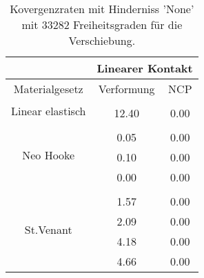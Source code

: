 \begin{table} 
\centering 
\begin{tabular}{c|cc|} 
\cline{2-3} 
 & \multicolumn{2}{|c|}{Linearer Kontakt} \\ 
\hline 
\multicolumn{1}{|c|}{Materialgesetz} & \multicolumn{1}{c|}{Verformung} & \multicolumn{1}{c|}{NCP} \\ 
\hline 
\multicolumn{1}{|c|}{\multirow{2}{*}{Linear elastisch}} &\multicolumn{1}{|c|}{} & \multicolumn{1}{|c|}{} \\ 
\multicolumn{1}{|c|}{} & \multicolumn{1}{|c|}{     12.40} & \multicolumn{1}{|c|}{      0.00} \\ 
\hline 
\multicolumn{1}{|c|}{\multirow{4}{*}{Neo Hooke}} &\multicolumn{1}{|c|}{} & \multicolumn{1}{|c|}{} \\ 
\multicolumn{1}{|c|}{} & \multicolumn{1}{|c|}{      0.05} & \multicolumn{1}{|c|}{      0.00} \\ 
\multicolumn{1}{|c|}{} & \multicolumn{1}{|c|}{      0.10} & \multicolumn{1}{|c|}{      0.00} \\ 
\multicolumn{1}{|c|}{} & \multicolumn{1}{|c|}{      0.00} & \multicolumn{1}{|c|}{      0.00} \\ 
\hline 
\multicolumn{1}{|c|}{\multirow{5}{*}{St.Venant}} &\multicolumn{1}{|c|}{} & \multicolumn{1}{|c|}{} \\ 
\multicolumn{1}{|c|}{} & \multicolumn{1}{|c|}{      1.57} & \multicolumn{1}{|c|}{      0.00} \\ 
\multicolumn{1}{|c|}{} & \multicolumn{1}{|c|}{      2.09} & \multicolumn{1}{|c|}{      0.00} \\ 
\multicolumn{1}{|c|}{} & \multicolumn{1}{|c|}{      4.18} & \multicolumn{1}{|c|}{      0.00} \\ 
\multicolumn{1}{|c|}{} & \multicolumn{1}{|c|}{      4.66} & \multicolumn{1}{|c|}{      0.00} \\ 
\hline 
\end{tabular}\caption{Kovergenzraten mit Hinderniss 'None' mit 33282 Freiheitsgraden für die Verschiebung.}\label{tab:Rate_None_level6}
\end{table} 
